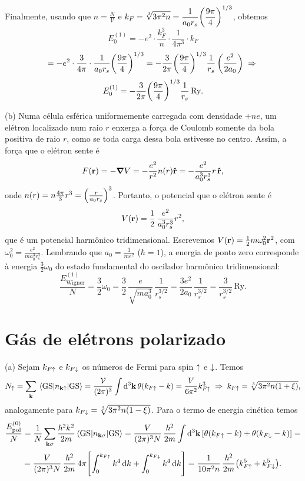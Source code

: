 \documentclass[a4paper,10pt]{article}
\begin{document}
Finalmente, usando que $n = \frac{N}{\mathcal{V}}$ e $\displaystyle{ k_F = \sqrt[3]{3 \pi^2 n} = \frac{1}{a_0 r_s} \qty(\frac{9\pi}{4})^{1/3} }$, obtemos
\begin{equation} \label{eq:1ord}
E_0^{(1)} =
- e^2 \cdot \frac{k_F^3}{n} \cdot
\frac{1}{4 \pi^3} \cdot k_F
\end{equation}
$$
= - e^2 \cdot \frac{3}{4 \pi} \cdot \frac{1}{a_0 r_s} \qty(\frac{9\pi}{4})^{1/3}
= - \frac{3}{2\pi} \qty(\frac{9\pi}{4})^{1/3} \frac{1}{r_s} \, \qty(\frac{e^2}{2a_0}) \; \Rightarrow \;
$$
$$
E_0^{(1)}
= - \frac{3}{2\pi} \qty(\frac{9\pi}{4})^{1/3} \frac{1}{r_s} \, \text{Ry}.
$$

\n

(b) Numa célula esférica uniformemente carregada com densidade $+ne$, um elétron localizado num raio $r$ enxerga a força de Coulomb somente da bola positiva de raio $r$, como se toda carga dessa bola estivesse no centro. Assim, a força que o elétron sente é
$$
F(\vb{r}) = -\grad{V} = - \frac{e^2}{r^2} n(r) \vu{r} = -\frac{e^2}{a_0^3 r_s^3} r \, \vu{r},
$$
onde $n(r) = n \frac{4 \pi}{3} r^3 = \qty(\frac{r}{a_0 r_s})^3$. Portanto, o potencial que o elétron sente é
$$
V(\vb{r}) = \frac{1}{2} \, \frac{e^2}{a_0^3 r_s^3} r^2,
$$
que é um potencial harmônico tridimensional. Escrevemos $V(\vb{r}) = \frac{1}{2} m \omega_0^2 \vb{r}^2$, com $\omega_0^2 = \frac{e^2}{m a_0^3 r_s^3}$. Lembrando que $a_0 = \frac{1}{m e^2}$ ($\hbar = 1$), a energia de ponto zero corresponde à energia $\frac{3}{2} \omega_0$ do estado fundamental do oscilador harmônico tridimensional:
$$
\frac{E_{\text{Wigner}}^{(1)}}{N} = \frac{3}{2} \omega_0 =
\frac{3}{2} \, \frac{e}{\sqrt{m a_0^3}} \, \frac{1}{r_s^{3/2}} =
\frac{3 e^2}{2 a_0} \, \frac{1}{r_s^{3/2}} = \frac{3}{r_s^{3/2}} \, \text{Ry}.
$$


\pagebreak

\section{Gás de elétrons polarizado}

(a) Sejam $k_{F \uparrow}$ e $k_{F \downarrow}$ os números de Fermi para spin $\uparrow$ e $\downarrow$. Temos
$$
N_{\up} = \sum_{\k} \ev{n_{\k \up}}{\text{GS}} =
\frac{\mathcal{V}}{(2\pi)^3} \int \dd[3]{\k} \theta(k_{F\up} - k) = \frac{V}{6 \pi^2} k_{F\up}^3 \implies
k_{F\up} = \sqrt[3]{3 \pi^2 n (1 + \xi)},
$$
analogamente para $k_{F\downarrow} = \sqrt[3]{3 \pi^2 n (1 - \xi)}$. Para o termo de energia cinética temos
$$
\frac{E_{\text{pol}}^{(0)}}{N} = \frac{1}{N} \sum_{\k \s} \frac{\hbar^2 k^2}{2m} \ev{n_{\k\s}}{\text{GS}} =
\frac{V}{(2 \pi)^3 N} \, \frac{\hbar^2}{2m} \int \dd[3]{\k} \qty[ \theta(k_{F\up} - k) + \theta(k_{F\down} - k) ] =
$$
$$
= \frac{V}{(2 \pi)^3 N} \, \frac{\hbar^2}{2m} \, 4 \pi \qty[\int_0^{k_{F\uparrow}} k^4 \dd{k} + \int_0^{k_{F\downarrow}} k^4 \dd{k}]
= \frac{1}{10 \pi^2 n} \, \frac{\hbar^2}{2m} \qty(k_{F\uparrow}^5 + k_{F\downarrow}^5).
$$
\end{document}

